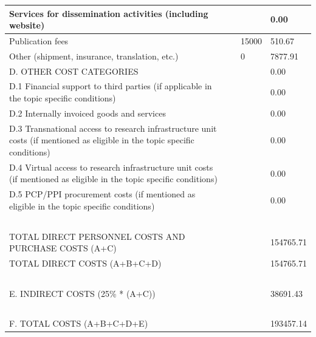 \begin{table}[H]
\begin{tabular}{|l|l|l|l|}
Services for dissemination activities (including website) & ~ & ~ & 0.00 \\ \hline
Publication fees & ~ & 15000 & 510.67 \\ \hline
Other (shipment, insurance, translation, etc.) & ~ & 0 & 7877.91 \\ \hline
D. OTHER COST CATEGORIES & ~ & ~ & 0.00\\ \hline
D.1 Financial support to third parties (if applicable in the topic specific conditions) & ~ & ~ & 0.00 \\ \hline
D.2 Internally invoiced goods and services & ~ & ~ & 0.00 \\ \hline
D.3 Transnational access to research infrastructure unit costs (if mentioned as eligible in the topic specific conditions) & ~ & ~ & 0.00 \\ \hline
D.4 Virtual access to research infrastructure unit costs (if mentioned as eligible in the topic specific conditions) & ~ & ~ & 0.00 \\ \hline
D.5 PCP/PPI procurement costs (if mentioned as eligible in the topic specific conditions) & ~ & ~ & 0.00 \\ \hline
~ & ~ & ~ & ~ \\ \hline
TOTAL DIRECT PERSONNEL COSTS AND PURCHASE COSTS (A+C) & ~ & ~ & 154765.71 \\ \hline
TOTAL DIRECT COSTS (A+B+C+D) & ~ & ~ & 154765.71 \\ \hline
~ & ~ & ~ & ~ \\ \hline
E. INDIRECT COSTS (25\% * (A+C)) & ~ & ~ & 38691.43 \\ \hline
~ & ~ & ~ & ~ \\ \hline
F. TOTAL COSTS (A+B+C+D+E) & ~ & ~ & 193457.14 \\ \hline
\end{tabular}
\end{table}
